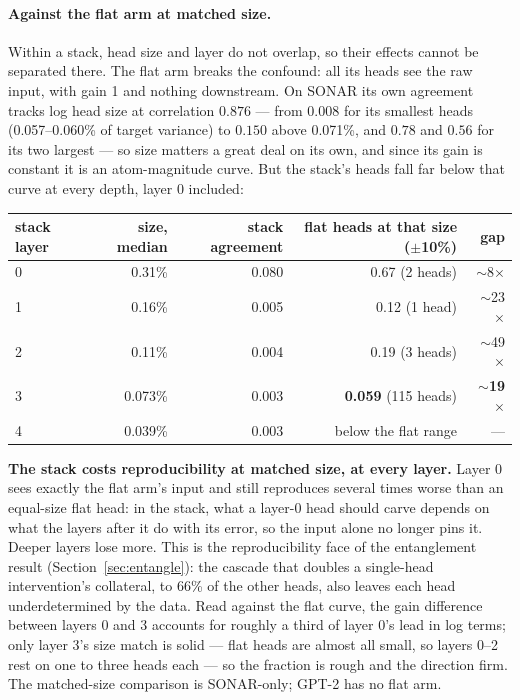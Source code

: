 \paragraph{Against the flat arm at matched size.} Within a stack, head
size and layer do not overlap, so their effects cannot be separated
there. The flat arm breaks the confound: all its heads see the raw input,
with gain 1 and nothing downstream. On SONAR its own agreement tracks
log head size at correlation $0.876$ --- from $0.008$ for its smallest heads
(0.057--0.060\% of target variance) to $0.150$ above 0.071\%, and $0.78$
and $0.56$ for its two largest --- so size matters a great deal on its
own, and since its gain is constant it is an atom-magnitude curve. But
the stack's heads fall far below that curve at every depth, layer 0
included:

\begin{center}\small
\begin{tabular}{@{}lrrrr@{}}
\toprule
stack layer & size, median & stack agreement & flat heads at that size ($\pm$10\%) & gap \\
\midrule
0 & 0.31\% & 0.080 & 0.67 (2 heads) & $\sim$8$\times$ \\
1 & 0.16\% & 0.005 & 0.12 (1 head) & $\sim$23$\times$ \\
2 & 0.11\% & 0.004 & 0.19 (3 heads) & $\sim$49$\times$ \\
3 & 0.073\% & 0.003 & \textbf{0.059} (115 heads) & $\sim$\textbf{19}$\times$ \\
4 & 0.039\% & 0.003 & below the flat range & --- \\
\bottomrule
\end{tabular}
\end{center}

\textbf{The stack costs reproducibility at matched size, at every
layer.} Layer 0 sees exactly the flat arm's input and still reproduces
several times worse than an equal-size flat head: in the stack, what a
layer-0 head should carve depends on what the layers after it do with
its error, so the input alone no longer pins it. Deeper layers lose
more. This is the reproducibility face of the entanglement result
(Section~\ref{sec:entangle}): the cascade that doubles a single-head
intervention's collateral, to 66\% of the other heads, also leaves each
head underdetermined by the data. Read against the flat curve, the gain
difference between layers 0 and 3 accounts for roughly a third of layer
0's lead in log terms; only layer 3's size match is solid --- flat heads
are almost all small, so layers 0--2 rest on one to three heads each ---
so the fraction is rough and the direction firm. The matched-size
comparison is SONAR-only; GPT-2 has no flat arm.

